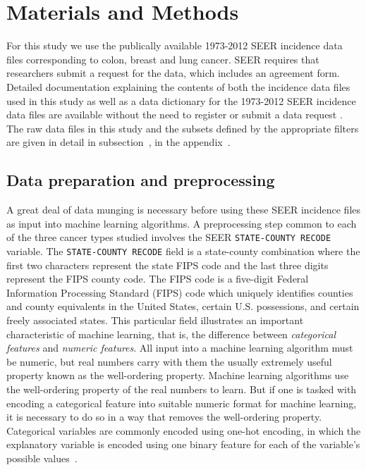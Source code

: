 \documentclass[10pt,letterpaper]{article}
\newcommand{\codewhite}[1]{\colorbox{white}{\texttt{#1}}}
\begin{document}
\section*{Materials and Methods}
\label{sec:materialsandmethods}
For this study we use the publically available 1973-2012 SEER incidence data files corresponding to colon, breast and lung cancer.
SEER requires that researchers submit a request for the data, which includes an agreement form. Detailed documentation explaining the contents of both the incidence data files used in this study as well as a data dictionary for the 1973-2012 SEER incidence data files are available without the need to register or submit a data request \cite{seerdoc}. The raw data files in this study and the subsets defined by the appropriate filters are given in detail in
subsection~, in the appendix~. 
 


\subsection*{Data preparation and preprocessing}
\label{subsec:dataprep} 


A great deal of data munging is necessary before using these SEER incidence files as input into machine learning algorithms. A preprocessing step common to each of the three cancer types studied involves the SEER \codewhite{STATE-COUNTY RECODE} variable.
The \codewhite{STATE-COUNTY RECODE} field is a state-county combination where the first two characters represent the state FIPS code and the last three digits represent the FIPS county code.  The FIPS code is a five-digit Federal Information Processing Standard (FIPS) code which uniquely identifies counties and county equivalents in the United States, certain U.S. possessions, and certain freely associated states.
This particular field illustrates an important characteristic of machine learning, that is, the difference  between \textit{categorical features} and \textit{numeric features}. All input into a machine learning algorithm must be numeric, but real numbers carry with them the usually extremely useful property known as the well-ordering property. Machine learning algorithms use the well-ordering property of the real numbers to learn.
But if one is tasked with encoding a categorical feature into suitable numeric format for machine learning, it is necessary to do so in a way that removes the well-ordering property. Categorical variables are commonly encoded using one-hot encoding, in which the explanatory variable is encoded using one binary feature for each of the variable's possible values~\cite{bowles}.
\end{document}
